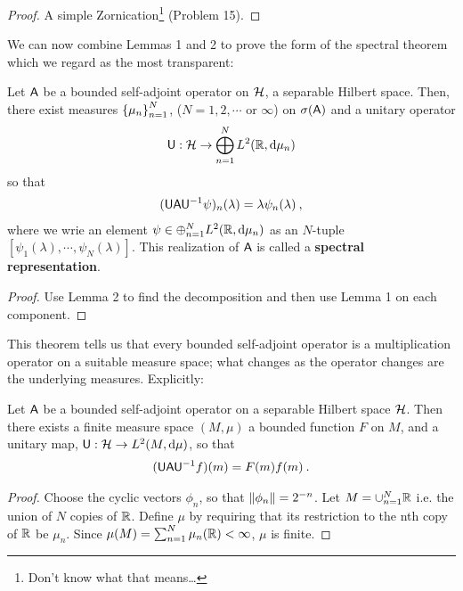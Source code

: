 \begin{proof}
    A simple Zornication\footnote{Don't know what that means\dots} (Problem 15).
\end{proof}

We can now combine Lemmas 1 and 2 to prove the form of the spectral theorem which we regard as the most transparent:

\begin{theorem}
    Let $\mathsf{A}$ be a bounded self-adjoint operator on $\mathcal{H}$, a separable Hilbert space. Then, there exist measures $\left \lbrace \mu_n \right \rbrace_{n=1}^N$, ($N = 1,2,\cdots$ or $\infty$) on $\sigma(\mathsf{A})$ and a unitary operator
    \begin{align}
        \mathsf{U} : \mathcal{H} \to \bigoplus_{n=1}^N L^{2}(\mathbb{R}, \mathrm{d} \mu_n)
    \end{align}
    so that \begin{align}
        (\mathsf{U} \mathsf{A} \mathsf{U}^{-1} \psi)_n (\lambda) = \lambda \psi_n(\lambda) \:,
    \end{align}
    where we wrie an element $\psi \in \oplus_{n=1}^N L^{2}(\mathbb{R}, \mathrm{d} \mu_n)$ as an $N$-tuple $[\psi_1(\lambda), \cdots, \psi_N(\lambda)]$. This realization of $\mathsf{A}$ is called a \textbf{spectral representation}.
\end{theorem}

\begin{proof}
    Use Lemma 2 to find the decomposition and then use Lemma 1 on each component.
\end{proof}

This theorem tells us that every bounded self-adjoint operator is a multiplication operator on a suitable measure space; what changes as the operator changes are the underlying measures. Explicitly:

\begin{corollary}
    Let $\mathsf{A}$ be a bounded self-adjoint operator on a separable Hilbert space $\mathcal{H}$. Then there exists a finite measure space $(M, \mu)$ a bounded function $F$ on $M$, and a unitary map, $ \mathsf{U}: \mathcal{H} \to L^{2}(M, \mathrm{d} \mu)$, so that
    \begin{align}
        (\mathsf{U} \mathsf{A} \mathsf{U}^{-1} f) (m) = F(m) f(m) \:.
    \end{align}
\end{corollary}

\begin{proof}
    Choose the cyclic vectors $\phi_n$, so that $\left \Vert \phi_n \right \Vert = 2^{-n}$. Let $M = \cup_{n=1}^N \mathbb{R}$ i.e. the union of $N$ copies of $\mathbb{R}$. Define $\mu$ by requiring that its restriction to the nth copy of $\mathbb{R}$ be $\mu_n$. Since $\mu(M) = \sum_{n=1}^N \mu_n(\mathbb{R}) < \infty$, $\mu$ is finite.
\end{proof}

